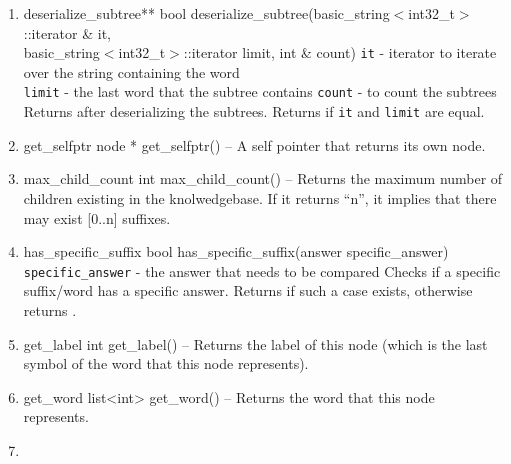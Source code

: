 \begin{enumerate}
\begin{detail}
{serialize\_subtree}
{void serialize\_subtree(basic\_string$<$int32\_t$>$ \& into)}
{\texttt{into} - the string that contains the serialized trees of the knowledgebase}
{Converts the subtree into \stringtype and appended to \texttt{into}. This method is used during serialization} 
\end{detail}
\item \begin{detail}
{deserialize\_subtree**}
{bool deserialize\_subtree(basic\_string$<$int32\_t$>$::iterator \& it, \\ basic\_string$<$int32\_t$>$::iterator limit, int \& count)}
{
\texttt{it} - iterator to iterate over the string containing the word \\
\texttt{limit} - the last word that the subtree contains
\texttt{count} - \integer to count the subtrees
 }
{Returns \true after deserializing the subtrees. Returns \false if \texttt{it} and \texttt{limit} are equal.} 
\end{detail}
\item \begin{detail}
{get\_selfptr}
{node * get\_selfptr()}
{--}
{A self pointer that returns its own node.} 
\end{detail}
\item \begin{detail}
{max\_child\_count}
{int max\_child\_count()}
{--}
{Returns the maximum number of children existing in the knolwedgebase. If it returns ``n'', it implies that there may exist [0..n] suffixes.} 
\end{detail}
\item \begin{detail}
{has\_specific\_suffix}
{bool has\_specific\_suffix(answer specific\_answer)}
{\texttt{specific\_answer} - the answer that needs to be compared}
{Checks if a specific suffix/word has a specific answer. Returns \true if such a case exists, otherwise returns \false.} 
\end{detail}
\item \begin{detail}
{get\_label}
{int get\_label()}
{--}
{Returns the label of this node (which is the last symbol of the word that this node represents).} 
\end{detail}
\item \begin{detail}
{get\_word}
{list<int> get\_word()}
{--}
{Returns the word that this node represents.} 
\end{detail}
\item \begin{detail}

\end{detail}
\end{enumerate}
